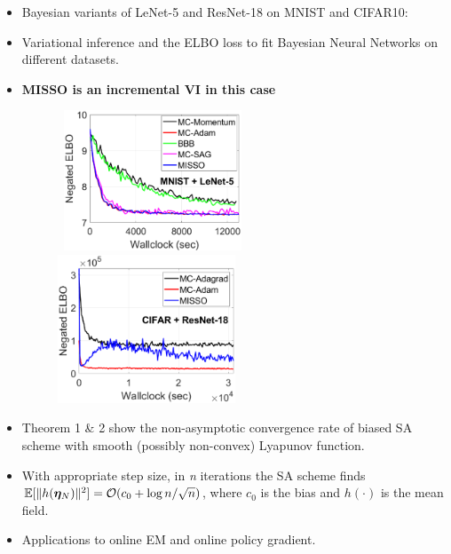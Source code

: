 \documentclass[a0,landscape]{a0poster}
\theoremstyle{definition}
\begin{document}
\begin{multicols}{3}
\begin{tcolorbox}[colback=white!5!white,colframe=red!75!black,fonttitle=\sffamily\bfseries\large,title=Numerical Experiments]
\begin{itemize}
\item Bayesian variants of LeNet-5 and ResNet-18 on MNIST and CIFAR10:
\item Variational inference and the ELBO loss to fit Bayesian Neural Networks on different datasets.
\item \textbf{MISSO is an incremental VI in this case}
\begin{figure}[H]
\centering
    \mbox{
        \includegraphics[width=0.5\textwidth]{fig/mnist.eps}
        \includegraphics[width=0.5\textwidth]{fig/cifar.eps}
    }
\label{fig:gmmplots}
\end{figure} 
\end{itemize}
\end{tcolorbox}

\begin{tcolorbox}[colback=white!5!white,colframe=blue!75!black,fonttitle=\sffamily\bfseries\large,title=Conclusion]
\begin{itemize}
\item {\color{blue} Theorem 1 \& 2} show the non-asymptotic convergence rate of biased SA scheme with smooth (possibly non-convex) Lyapunov function. 
\item With appropriate step size, in \emph{n} iterations the SA scheme finds 
$\mathbb{E}[ \| h( \bm{\eta}_N ) \|^2 ] = {\cal O}( c_0 + \log n / \sqrt{n} )$, where $c_0$ is the bias and $h(\cdot)$ is the mean field.
\item Applications to online EM and online policy gradient.
\end{itemize}
\end{tcolorbox}
\vspace{-1.3cm}
\small



\end{multicols}
\end{document}
